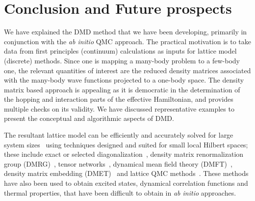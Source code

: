 \section{Conclusion and Future prospects}



We have explained the DMD method that we have been developing, primarily in conjunction with the 
\textit{ab initio} QMC approach. The practical motivation is to take data from first principles (continuum) 
calculations as inputs for lattice model (discrete) methods. 
Since one is mapping a many-body problem to a few-body one, the relevant quantities of interest are 
the reduced density matrices associated with the many-body wave functions projected to a one-body space. 
The density matrix based approach is appealing as it is democratic in the determination of the hopping and interaction parts of the effective Hamiltonian, and provides multiple checks on its validity. 
We have discussed representative examples to present the conceptual and algorithmic aspects of DMD. 

The resultant lattice model can be efficiently and accurately solved for large system sizes~\cite{LeBlanc_PRX} using techniques designed and suited for small local Hilbert spaces; these include exact or selected diagonalization~\cite{DeRaedt,Tubman_selci,Holmes_Tubman_Umrigar}, density matrix renormalization group (DMRG)~\cite{White1992}, tensor networks~\cite{PEPS,Changlani_CPS,NeuscammanCPS}, dynamical mean field theory (DMFT)~\cite{Kotliar2006}, density matrix embedding (DMET)~\cite{DMET_2012} and lattice QMC methods~\cite{Scalapino, Trivedi_Ceperley, Zhang_AFQMC, Sandvik_loops, Prokofiev, 
Booth2009,SQMC,Holmes_Changlani_Umrigar, Booth2013}. 
These methods have also been used to obtain excited states, dynamical correlation functions and thermal properties, that have been difficult to obtain in \textit{ab initio} approaches. 


